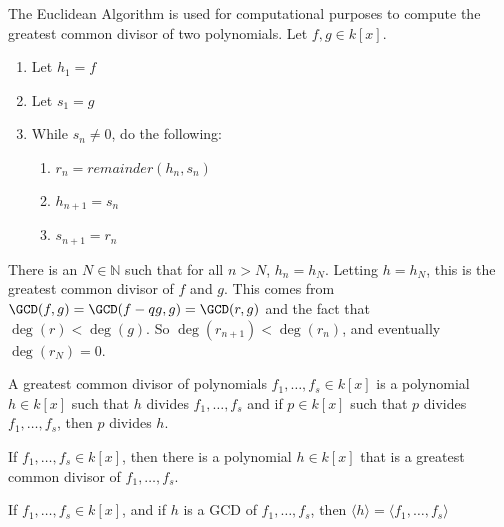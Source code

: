 \documentclass[crop=false,class=article,oneside]{standalone}
\begin{document}
    \begin{remark}
    The Euclidean Algorithm is used for computational purposes to compute the greatest common divisor of two polynomials. Let $f,g\in k[x]$.
    \begin{enumerate}
        \item Let $h_{1}=f$
        \item Let $s_{1}=g$
        \item While $s_{n}\ne 0$, do the following:
        \begin{enumerate}
            \item $r_{n}=remainder(h_{n},s_{n})$
            \item $h_{n+1}=s_{n}$
            \item $s_{n+1}=r_{n}$
        \end{enumerate}
    \end{enumerate}
    There is an $N\in \mathbb{N}$ such that for all $n>N$, $h_n = h_N$. Letting $h = h_N$, this is the greatest common divisor of $f$ and $g$. This comes from $\GCD(f,g)=\GCD(f-qg,g)=\GCD(r,g)$ and the fact that $\deg(r)<\deg(g)$. So $\deg(r_{n+1})<\deg(r_{n})$, and eventually $\deg(r_{N})=0$.
    \end{remark}
    \begin{definition}
    A greatest common divisor of polynomials $f_1,\hdots, f_s \in k[x]$ is a polynomial $h\in k[x]$ such that $h$ divides $f_1,\hdots, f_s$ and if $p\in k[x]$ such that $p$ divides $f_1,\hdots, f_s$, then $p$ divides $h$.
    \end{definition}
    \begin{theorem}
    If $f_{1},\hdots, f_{s}\in k[x]$, then there is a polynomial $h\in k[x]$ that is a greatest common divisor of $f_{1},\hdots,f_{s}$.
    \end{theorem}
    \begin{theorem}
    If $f_{1},\hdots,f_{s}\in k[x]$, and if $h$ is a GCD of $f_{1},\hdots, f_{s}$, then $\langle h\rangle=\langle f_{1},\hdots, f_{s}\rangle$
    \end{theorem}
\end{document}
